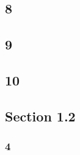 \subsection*{8}
\begin{enumerate}
\end{enumerate}

\subsection*{9}
\begin{enumerate}
\end{enumerate}

\subsection*{10}
\begin{enumerate}
\end{enumerate}

\subsection*{Section 1.2}
\subsubsection*{4}

